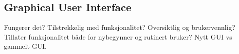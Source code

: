 \subsection{Graphical User Interface}
Fungerer det? Tilstrekkelig med funksjonalitet? Oversiktlig og brukervennlig? Tillater funksjonalitet både for nybegynner og rutinert bruker? Nytt GUI vs gammelt GUI.